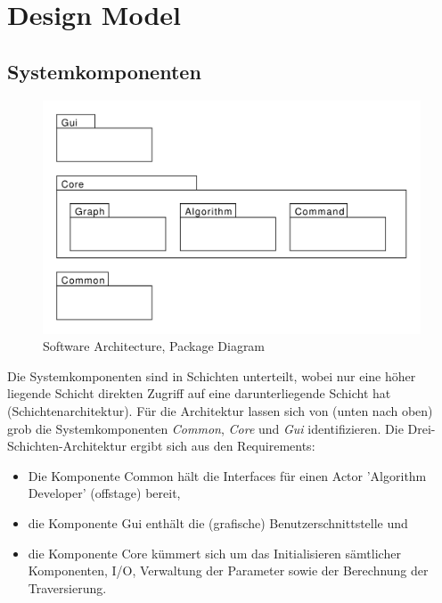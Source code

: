 \section{Design Model}
\label{sec:Design Model}
% 
\subsection{Systemkomponenten}
\label{subsec:Systemkomponenten}
% 
\begin{figure}[H]
    \centering
    \includegraphics[scale=0.5]{diagrams/package-diagram.pdf}
    \caption{Software Architecture, Package Diagram}
    \label{fig:package-diagram}
\end{figure}
% 
Die Systemkomponenten sind in Schichten unterteilt, wobei nur eine h\"oher liegende Schicht direkten Zugriff auf eine darunterliegende Schicht hat (Schichtenarchitektur). F\"ur die Architektur lassen sich von (unten nach oben) grob die Systemkomponenten \textit{Common}, \textit{Core} und \textit{Gui} identifizieren. Die Drei-Schichten-Architektur ergibt sich aus den Requirements:
\begin{itemize}
  \item Die Komponente Common h\"alt die Interfaces f\"ur einen Actor 'Algorithm Developer' (offstage) bereit,
  \item die Komponente Gui enth\"alt die (grafische) Benutzerschnittstelle und 
  \item die Komponente Core k\"ummert sich um das Initialisieren s\"amtlicher Komponenten, I/O, Verwaltung der Parameter sowie der Berechnung der Traversierung.
\end{itemize}
% 
